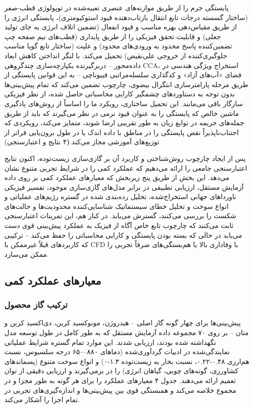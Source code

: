 \documentclass[12pt, a4paper]{article}
\begin{document}
پایستگی جرم را از طریق موازنه‌های عنصری تعبیه‌شده در توپولوژی قطب-صفر (ساختار گسسته درجات تابع انتقال بازتاب‌دهنده قیود استوکیومتری)، پایستگی انرژی را از طریق مقیاس‌دهی بهره مناسب و قیود انفعال (تضمین اتلاف انرژی به جای تولید جعلی) و قابلیت تحقق فیزیکی را از طریق پایداری (قطب‌های نیم صفحه چپ تضمین‌کننده پاسخ محدود به ورودی‌های محدود) و علیت (ساختار تابع گویا مناسب جلوگیری‌کننده از خروجی علی‌نقیض) تحمیل می‌کند. با لنگر انداختن کاهش ابعاد داده‌محور – دربرگیرنده یکپارچه‌سازی چندگروهی CCA، استخراج ویژگی هندسی در فضای «آب‌های آزاد» و کدگذاری سلسله‌مراتبی فیبوناچی – به این قوانین پایستگی از طریق مرحله پارامترسازی انتگرال بیضوی، چارچوب تضمین می‌کند که تمام پیش‌بینی‌ها بدون توجه به دستاوردهای چشمگیر کارایی محاسباتی حاصل شده، از نظر فیزیکی سازگار باقی می‌مانند. این تحمیل ساختاری، رویکرد ما را اساساً از روش‌های یادگیری ماشین خالص که پایستگی را به عنوان قیود نرمی در نظر می‌گیرند که باید از طریق جمله‌های جریمه در توابع زیان به طور تقریبی ارضا شوند، متمایز می‌کند، رویکردی که اجتناب‌ناپذیراً نقض پایستگی را در مناطق با داده اندک یا در طول برون‌یابی فراتر از توزیع‌های آموزشی مجاز می‌کند.\textbf(۴ نتایج و اعتبارسنجی)

پس از ایجاد چارچوب روش‌شناختی و کاربرد آن بر گازی‌سازی زیست‌توده، اکنون نتایج اعتبارسنجی جامعی را ارائه می‌دهیم که عملکرد کمی را در شرایط تجربی متنوع نشان می‌دهد. این بخش از طریق پنج زیربخش که معیارهای عملکرد کمی بر روی داده آزمایش مستقل، ارزیابی تطبیقی در برابر مدل‌های گازی‌سازی موجود، تفسیر فیزیکی ناورداهای جهانی استخراج‌شده، تحلیل رده‌بندی شده در گستره رژیم‌های عملیاتی و انواع سوخت و تحلیل خطای سیستماتیک شناسایی‌کننده محدودیت‌ها و حالت‌های شکست را بررسی می‌کنند، گسترش می‌یابد. در کنار هم، این تمرینات اعتبارسنجی ثابت می‌کنند که چارچوب تابع خاص آگاه از فیزیک به عملکرد پیش‌بینی قوی دست می‌یابد در حالی که بسته بودن پایستگی و کارایی محاسباتی را حفظ می‌کند – ترکیبی که کاربردهای قبلاً غیرممکن با CFD با وفاداری بالا یا هم‌بستگی‌های صرفاً تجربی را ممکن می‌سازد.

\subsection{معیارهای عملکرد کمی}

\subsubsection{ترکیب گاز محصول}

پیش‌بینی‌ها برای چهار گونه گاز اصلی – هیدروژن، مونوکسید کربن، دی‌اکسید کربن و متان – بر روی ۷۰ مجموعه داده آزمایش مستقل که به طور کامل در طول توسعه مدل نگهداشته شده بودند، ارزیابی شدند. این موارد تمام گستره شرایط عملیاتی نمایندگی‌شده در ادبیات گردآوری‌شده (دماهای ۸۸۰–۶۵۰ درجه سلسیوس، نسبت هم‌ارزی ۰.۴۸-۰.۲۲، نسبت بخار به زیست‌توده ۱.۳-۰) و انواع سوخت متنوع (پسماندهای کشاورزی، گونه‌های چوبی، گیاهان انرژی) را در برمی‌گیرند و ارزیابی دقیقی از توان تعمیم ارائه می‌دهند. جدول ۴ معیارهای عملکرد را برای هر گونه به طور مجزا و در مجموع خلاصه می‌کند و همبستگی قوی بین پیش‌بینی‌ها و اندازه‌گیری‌های تجربی در تمام اجزا را آشکار می‌کند.
\end{document}
